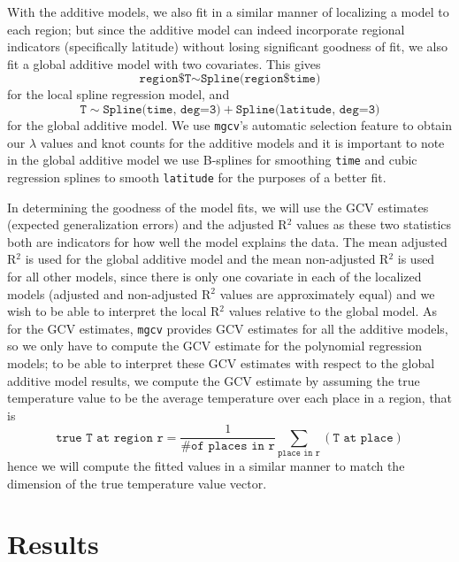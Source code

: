 \documentclass[aoas]{imsart}\usepackage[]{graphicx}\usepackage[]{xcolor}
\begin{document}
With the additive models, we also fit in a similar manner of localizing a model to each region; but since the additive model can indeed incorporate regional indicators (specifically latitude) without losing significant goodness of fit, we also fit a global additive model with two covariates. This gives
$$\texttt{region\$T}\sim\texttt{Spline(region\$time)}$$
for the local spline regression model, and
$$\texttt{T}\sim\texttt{Spline(time, deg=3)}+\texttt{Spline(latitude, deg=3)}$$
for the global additive model. We use \texttt{mgcv}'s automatic selection feature to obtain our $\lambda$ values and knot counts for the additive models and it is important to note in the global additive model we use B-splines for smoothing \texttt{time} and cubic regression splines to smooth \texttt{latitude} for the purposes of a better fit.

In determining the goodness of the model fits, we will use the GCV estimates (expected generalization errors) and the adjusted R$^2$ values as these two statistics both are indicators for how well the model explains the data. The mean adjusted R$^2$ is used for the global additive model and the mean non-adjusted R$^2$ is used for all other models, since there is only one covariate in each of the localized models (adjusted and non-adjusted R$^2$ values are approximately equal) and we wish to be able to interpret the local R$^2$ values relative to the global model. As for the GCV estimates, \texttt{mgcv} provides GCV estimates for all the additive models, so we only have to compute the GCV estimate for the polynomial regression models; to be able to interpret these GCV estimates with respect to the global additive model results, we compute the GCV estimate by assuming the true temperature value to be the average temperature over each place in a region, that is
$$\texttt{true T at region r}=\frac{1}{\texttt{\# of places in r}}\sum_{\texttt{place in r}}(\texttt{T at place})$$
hence we will compute the fitted values in a similar manner to match the dimension of the true temperature value vector.

\section{Results}\hfill\\
\end{document}
